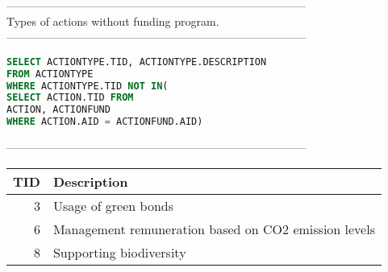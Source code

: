 --------------------------------------------------------------------------------
\\Types of actions without funding program.\\
--------------------------------------------------------------------------------
\begin{lstlisting}[language = SQL]
SELECT ACTIONTYPE.TID, ACTIONTYPE.DESCRIPTION
FROM ACTIONTYPE 
WHERE ACTIONTYPE.TID NOT IN(
SELECT ACTION.TID FROM
ACTION, ACTIONFUND
WHERE ACTION.AID = ACTIONFUND.AID)
\end{lstlisting}
--------------------------------------------------------------------------------
\\\begin{tabular}{rl}
\toprule
   TID & Description                                          \\
\midrule
     3 & Usage of green bonds                                 \\
     6 & Management remuneration based on CO2 emission levels \\
     8 & Supporting biodiversity                              \\
\bottomrule
\end{tabular}